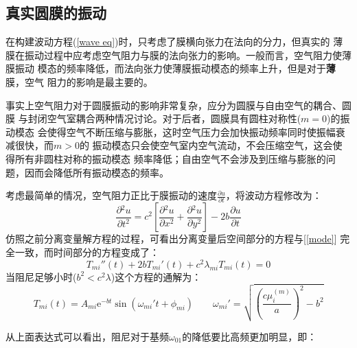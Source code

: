 \documentclass[a4paper]{ctexart}
\def\e{\mathrm{e}}
\newcommand{\pdv}[2]{\frac{\partial{#1}}{\partial{#2}}}
\begin{document}
	\subsection{真实圆膜的振动}
	\par 
	在构建波动方程(\ref{wave eq})时，只考虑了膜横向张力在法向的分力，但真实的
	薄膜在振动过程中应考虑空气阻力与膜的法向张力的影响。一般而言，空气阻力使薄膜振动
	模态的频率降低，而法向张力使薄膜振动模态的频率上升，但是对于\textbf{薄}膜，空气
	阻力的影响是最主要的\cite{phy_of_music}。
	\par 事实上空气阻力对于圆膜振动的影响非常复杂，应分为圆膜与自由空气的耦合、圆膜
	与封闭空气室耦合两种情况讨论。对于后者，圆膜具有圆柱对称性($m=0$)的振动模态
	会使得空气不断压缩与膨胀，这时空气压力会加快振动频率同时使振幅衰减很快，而$m>0$的
	振动模态只会使空气室内空气流动，不会压缩空气，这会使得所有非圆柱对称的振动模态
	频率降低；自由空气不会涉及到压缩与膨胀的问题，因而会降低所有振动模态的频率。
	\par
	考虑最简单的情况，空气阻力正比于膜振动的速度$\pdv{u}{t}$，将波动方程修改为：
	\begin{equation}
		\pdv{^2u}{t^2} = c^2\left[\pdv{^2u}{x^2} + \pdv{^2u}{y^2}\right] - 2b\pdv{u}{t}
	\end{equation}   
	仿照之前分离变量解方程的过程，可看出分离变量后空间部分的方程与[\ref{mode}]
	完全一致，而时间部分的方程变成了：
	\begin{equation}
		T_{mi}{''}(t) + 2bT_{mi}{'}(t) + c^2 \lambda_{mi} T_{mi}(t) = 0
	\end{equation}
	当阻尼足够小时($b^2 < c^2 \lambda$)这个方程的通解为：
	\begin{equation}
		T_{mi}(t) = A_{mi}\e^{-bt}\sin(\omega_{mi}{'}t + \phi_{mi})\quad\quad \omega_{mi}{'} = \sqrt{\left(\frac{c\mu_{i}^{(m)}}{a}\right)^2 - b^2}
	\end{equation}
	\par 从上面表达式可以看出，阻尼对于基频$\omega_{01}$的降低要比高频更加明显，即：
\end{document}
